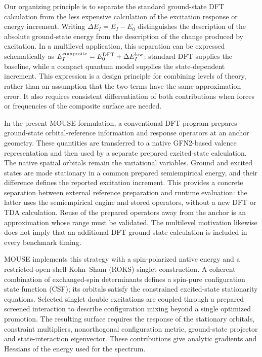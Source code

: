 \documentclass[11pt,a4paper]{article}
\begin{document}
Our organizing principle is to separate the standard ground-state DFT calculation from the less expensive calculation of the excitation response or energy increment. Writing $\Delta E_I=E_I-E_0$ distinguishes the description of the absolute ground-state energy from the description of the change produced by excitation. In a multilevel application, this separation can be expressed schematically as $E_I^{\rm composite}=E_0^{\rm DFT}+\Delta E_I^{\rm low}$: standard DFT supplies the baseline, while a compact quantum model supplies the state-dependent increment. This expression is a design principle for combining levels of theory, rather than an assumption that the two terms have the same approximation error. It also requires consistent differentiation of both contributions when forces or frequencies of the composite surface are needed.

In the present MOUSE formulation, a conventional DFT program prepares ground-state orbital-reference information and response operators at an anchor geometry. These quantities are transferred to a native GFN2-based valence representation and then used by a separate prepared excited-state calculation.\cite{gfn2} The native spatial orbitals remain the variational variables. Ground and excited states are made stationary in a common prepared semiempirical energy, and their difference defines the reported excitation increment. This provides a concrete separation between external reference preparation and runtime evaluation: the latter uses the semiempirical engine and stored operators, without a new DFT or TDA calculation. Reuse of the prepared operators away from the anchor is an approximation whose range must be validated. The multilevel motivation likewise does not imply that an additional DFT ground-state calculation is included in every benchmark timing.

MOUSE implements this strategy with a spin-polarized native energy and a
restricted-open-shell Kohn--Sham (ROKS) singlet construction.\cite{roks1998}
A coherent combination of exchanged-spin determinants defines a spin-pure
configuration state function (CSF); its orbitals satisfy the constrained
excited-state stationarity equations. Selected singlet double excitations are
coupled through a prepared screened interaction to describe configuration
mixing beyond a single optimized promotion. The resulting surface requires
the response of the stationary orbitals, constraint multipliers, nonorthogonal
configuration metric, ground-state projector and state-interaction
eigenvector. These contributions give analytic gradients and Hessians of the
energy used for the spectrum.
\end{document}
